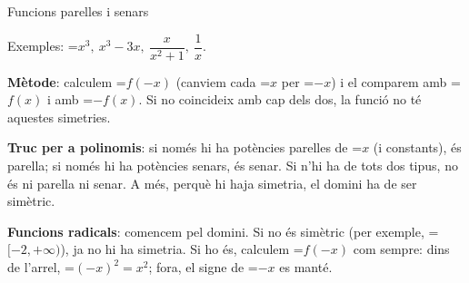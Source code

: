 \documentclass[11pt,a4paper]{article}
\newcommand{\fmm}[1]{\setbox0=\hbox{$#1$}\ifdim\wd0>\linewidth\[#1\]\else\mbox{\box0}\fi}
\newcommand{\fmuline}[1]{\textbf{\color{fmaccent}#1}}
\begin{document}
\begin{fmdef}{Funcions parelles i senars}
\begin{minipage}[t]{0.48\linewidth}
Exemples: \fmm{x^3,\ x^3-3x,\ \dfrac{x}{x^2+1},\ \dfrac{1}{x}}.\end{minipage}\hfill\begin{minipage}[t]{0.48\linewidth}\vspace{0pt}\raggedright \begin{center}\end{center}\end{minipage}\par\medskip

      

\fmuline{Mètode}: calculem \fmm{f(-x)} (canviem cada \fmm{x} per \fmm{-x}) i el comparem amb \fmm{f(x)} i amb \fmm{-f(x)}. Si no coincideix amb cap dels dos, la funció no té aquestes simetries.

      
\begin{fmnote}\fmuline{Truc per a polinomis}: si només hi ha potències parelles de \fmm{x} (i constants), és parella; si només hi ha potències senars, és senar. Si n'hi ha de tots dos tipus, no és ni parella ni senar. A més, perquè hi haja simetria, el domini ha de ser simètric.\end{fmnote}

      
\begin{fmnote}\fmuline{Funcions radicals}: comencem pel domini. Si no és simètric (per exemple, \fmm{[-2,+\infty)}), ja no hi ha simetria. Si ho és, calculem \fmm{f(-x)} com sempre: dins de l'arrel, \fmm{(-x)^2=x^2}; fora, el signe de \fmm{-x} es manté.\end{fmnote}
\end{fmdef}
\end{document}
